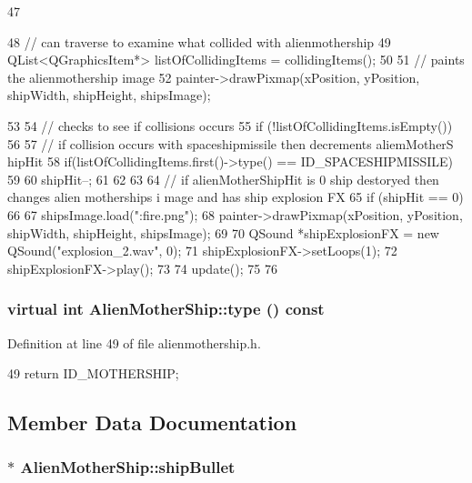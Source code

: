 \begin{DoxyCode}
47 {
48     // can traverse to examine what collided with alienmothership
49     QList<QGraphicsItem*> listOfCollidingItems = collidingItems();
50 
51     // paints the alienmothership image
52     painter->drawPixmap(xPosition, yPosition, shipWidth, shipHeight, shipsImage);
      
53 
54     // checks to see if collisions occurs
55     if (!listOfCollidingItems.isEmpty())
56     {
57         // if collision occurs with spaceshipmissile then decrements aliemMotherS
      hipHit
58         if(listOfCollidingItems.first()->type() == ID_SPACESHIPMISSILE)
59         {
60             shipHit--;
61         }
62     }
63 
64     // if alienMotherShipHit is 0 ship destoryed then changes alien motherships i
      mage and has ship explosion FX
65     if (shipHit == 0)
66     {
67         shipsImage.load(":fire.png");
68         painter->drawPixmap(xPosition, yPosition, shipWidth, shipHeight, 
      shipsImage);
69 
70         QSound *shipExplosionFX = new QSound("explosion_2.wav", 0);
71         shipExplosionFX->setLoops(1);
72         shipExplosionFX->play();
73 
74         update();
75     }
76 }
\end{DoxyCode}
\hypertarget{class_alien_mother_ship_a9146bdc7fbad43aa8b7dd8c6b94775ff}{
\subsubsection[{type}]{\setlength{\rightskip}{0pt plus 5cm}virtual int AlienMotherShip::type () const}}
\label{class_alien_mother_ship_a9146bdc7fbad43aa8b7dd8c6b94775ff}


Definition at line 49 of file alienmothership.h.


\begin{DoxyCode}
49 {return ID_MOTHERSHIP; }
\end{DoxyCode}


\subsection{Member Data Documentation}
\hypertarget{class_alien_mother_ship_a102d1a84a81c500cbc435479d505af3b}{
\subsubsection[{shipBullet}]{$\ast$ {\bf AlienMotherShip::shipBullet}}}
\label{class_alien_mother_ship_a102d1a84a81c500cbc435479d505af3b}


